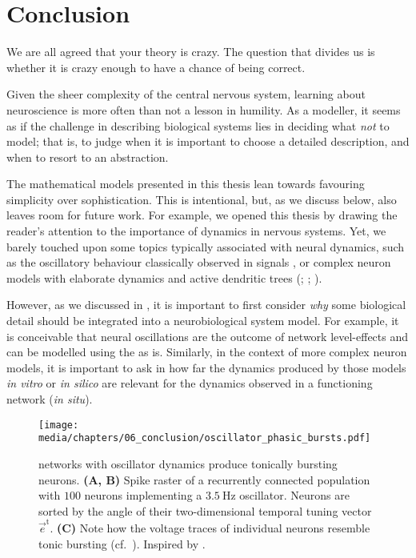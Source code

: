 
\chapter{Conclusion}
\label{chp:conclusion}

\begin{OpeningQuote}
We are all agreed that your theory is crazy. The question that divides us is whether it is crazy enough to have a chance of being correct.
\end{OpeningQuote}

Given the sheer complexity of the central nervous system, learning about neuroscience is more often than not a lesson in humility.
As a modeller, it seems as if the challenge in describing biological systems lies in deciding what \emph{not} to model; that is, to judge when it is important to choose a detailed description, and when to resort to an abstraction.

The mathematical models presented in this thesis lean towards favouring simplicity over sophistication.
This is intentional, but, as we discuss below, also leaves room for future work.
For example, we opened this thesis by drawing the reader's attention to the importance of dynamics in nervous systems.
Yet, we barely touched upon some topics typically associated with neural dynamics, such as the oscillatory behaviour classically observed in \EEG signals \citep[Chapter~8]{lopesdasilva2009electroencephalography,gerstner2002spiking}, or complex neuron models with elaborate dynamics and active dendritic trees (; \cite{izhikevich2007dynamical}; \cite{london2005dendritic}).

However, as we discussed in , it is important to first consider \emph{why} some biological detail should be integrated into a neurobiological system model.
For example, it is conceivable that neural oscillations are the outcome of network level-effects and can be modelled using the \NEF as is.
Similarly, in the context of more complex neuron models, it is important to ask in how far the dynamics produced by those models \emph{in vitro} or \emph{in silico} are relevant for the dynamics observed in a functioning network (\emph{in situ}).

\begin{figure}
	\centering
	\texttt{[image: media/chapters/06\_conclusion/oscillator\_phasic\_bursts.pdf]}
	\caption[NEF networks with oscillator dynamics produce tonically bursting neurons]{\NEF networks with oscillator dynamics produce tonically bursting neurons.
	\textbf{(A, B)} Spike raster of a recurrently connected \NEF population with $100$ neurons implementing a $\SI{3.5}{\hertz}$ oscillator.
	Neurons are sorted by the angle of their two-dimensional temporal tuning vector $\vec e^\mathrm{t}$.
	\textbf{(C)} Note how the voltage traces of individual neurons resemble tonic bursting (cf.~).
	Inspired by \citet[Figure~3.2, p.~48]{voelker2019}.
	}
	\label{fig:oscillator_phasic_bursts}
\end{figure}


